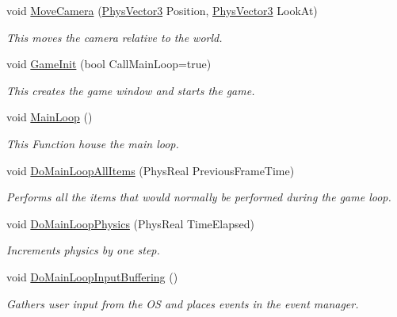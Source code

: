 \begin{DoxyCompactItemize}
void \hyperlink{classPhysWorld_a1df24ee06d5881825902b60e0d81174a}{MoveCamera} (\hyperlink{classPhysVector3}{PhysVector3} Position, \hyperlink{classPhysVector3}{PhysVector3} LookAt)
\begin{DoxyCompactList}\small\item\em This moves the camera relative to the world. \item\end{DoxyCompactList}\item 
void \hyperlink{classPhysWorld_afc5116f97cc1e91e899d1a1ca7e14e9b}{GameInit} (bool CallMainLoop=true)
\begin{DoxyCompactList}\small\item\em This creates the game window and starts the game. \item\end{DoxyCompactList}\item 
void \hyperlink{classPhysWorld_ad41cad0347b6f5ba7ec05568aaffa514}{MainLoop} ()
\begin{DoxyCompactList}\small\item\em This Function house the main loop. \item\end{DoxyCompactList}\item 
void \hyperlink{classPhysWorld_a174da29a119080c44ba628cb25918f8c}{DoMainLoopAllItems} (PhysReal PreviousFrameTime)
\begin{DoxyCompactList}\small\item\em Performs all the items that would normally be performed during the game loop. \item\end{DoxyCompactList}\item 
void \hyperlink{classPhysWorld_ad7455b4f54e8bac0aab090033cff59d4}{DoMainLoopPhysics} (PhysReal TimeElapsed)
\begin{DoxyCompactList}\small\item\em Increments physics by one step. \item\end{DoxyCompactList}\item 
void \hyperlink{classPhysWorld_a81b3f0dcc0a90d039623f696343e6e9c}{DoMainLoopInputBuffering} ()
\begin{DoxyCompactList}\small\item\em Gathers user input from the OS and places events in the event manager. \item\end{DoxyCompactList}\item 

\end{DoxyCompactItemize}
